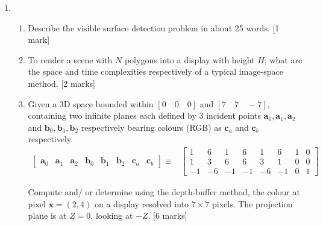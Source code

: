 \documentclass[11pt,a4paper,onecolumn]{tiet-question-paper}
\begin{document}
\begin{enumerate}[resume]
\item
  \begin{enumerate}
    \item Describe the visible surface detection
      problem in about 25 words. \hfill [1 mark]
    \item To render a scene with $N$ polygons into a
      display with height $H$; what are the space and
      time complexities respectively of a typical
      image-space method. \hfill [2 marks]
    \item Given a 3D space bounded within
      $[0\quad0\quad0]$ and $[7\quad7\quad-7]$,
      containing two infinite planes each defined by 3
      incident points
      $\mathbf{a}_0, \mathbf{a}_1, \mathbf{a}_2$ and
      $\mathbf{b}_0, \mathbf{b}_1, \mathbf{b}_2$
      respectively bearing colours (RGB) as
      $\mathbf{c}_a$ and $\textbf{c}_b$ respectively.
      \begin{align*}
        \begin{bmatrix}
          \mathbf{a}_0&\mathbf{a}_1&\mathbf{a}_2
          &\mathbf{b}_0&\mathbf{b}_1&\mathbf{b}_2
          &\mathbf{c}_a&\mathbf{c}_b
        \end{bmatrix}\equiv
        &\begin{bmatrix}
          1&6&1&6&1&6&1&0 \\
          1&3&6&6&3&1&0&0 \\
          -1&-6&-1&-1&-6&-1&0&1
        \end{bmatrix}
      \end{align*}

      Compute and/ or determine using the depth-buffer
      method, the colour at pixel $\mathbf{x}=(2,4)$ on
      a display resolved into $7\times7$ pixels. The
      projection plane is at $Z=0$, looking at
      $-Z$. \hfill [6 marks]
  \end{enumerate}
\end{enumerate}
\bvrhrule[0.4pt]
\end{document}
